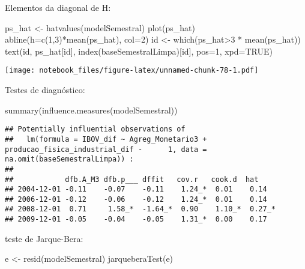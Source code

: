 \documentclass[
]{article}
\newenvironment{Shaded}{\begin{snugshade}}{\end{snugshade}}
\newcommand{\AttributeTok}[1]{\textcolor[rgb]{0.77,0.63,0.00}{#1}}
\newcommand{\ConstantTok}[1]{\textcolor[rgb]{0.00,0.00,0.00}{#1}}
\newcommand{\DecValTok}[1]{\textcolor[rgb]{0.00,0.00,0.81}{#1}}
\newcommand{\FunctionTok}[1]{\textcolor[rgb]{0.00,0.00,0.00}{#1}}
\newcommand{\NormalTok}[1]{#1}
\newcommand{\OtherTok}[1]{\textcolor[rgb]{0.56,0.35,0.01}{#1}}
\newcommand{\SpecialCharTok}[1]{\textcolor[rgb]{0.00,0.00,0.00}{#1}}
\begin{document}
Elementos da diagonal de H:

\begin{Shaded}
\begin{Highlighting}[]
\NormalTok{ps\_hat }\OtherTok{\textless{}{-}} \FunctionTok{hatvalues}\NormalTok{(modelSemestral)}
\FunctionTok{plot}\NormalTok{(ps\_hat)}
\FunctionTok{abline}\NormalTok{(}\AttributeTok{h=}\FunctionTok{c}\NormalTok{(}\DecValTok{1}\NormalTok{,}\DecValTok{3}\NormalTok{)}\SpecialCharTok{*}\FunctionTok{mean}\NormalTok{(ps\_hat), }\AttributeTok{col=}\DecValTok{2}\NormalTok{)}
\NormalTok{id }\OtherTok{\textless{}{-}} \FunctionTok{which}\NormalTok{(ps\_hat}\SpecialCharTok{\textgreater{}}\DecValTok{3} \SpecialCharTok{*} \FunctionTok{mean}\NormalTok{(ps\_hat))}
\FunctionTok{text}\NormalTok{(id, ps\_hat[id], }\FunctionTok{index}\NormalTok{(baseSemestralLimpa)[id], }\AttributeTok{pos=}\DecValTok{1}\NormalTok{, }\AttributeTok{xpd=}\ConstantTok{TRUE}\NormalTok{)}
\end{Highlighting}
\end{Shaded}

\texttt{[image: notebook\_files/figure-latex/unnamed-chunk-78-1.pdf]}

Testes de diagnóstico:

\begin{Shaded}
\begin{Highlighting}[]
\FunctionTok{summary}\NormalTok{(}\FunctionTok{influence.measures}\NormalTok{(modelSemestral))}
\end{Highlighting}
\end{Shaded}

\begin{verbatim}
## Potentially influential observations of
##   lm(formula = IBOV_dif ~ Agreg_Monetario3 + producao_fisica_industrial_dif -      1, data = na.omit(baseSemestralLimpa)) :
## 
##            dfb.A_M3 dfb.p___ dffit   cov.r   cook.d  hat    
## 2004-12-01 -0.11    -0.07    -0.11    1.24_*  0.01    0.14  
## 2006-12-01 -0.12    -0.06    -0.12    1.24_*  0.01    0.14  
## 2008-12-01  0.71     1.58_*  -1.64_*  0.90    1.10_*  0.27_*
## 2009-12-01 -0.05    -0.04    -0.05    1.31_*  0.00    0.17
\end{verbatim}

teste de Jarque-Bera:

\begin{Shaded}
\begin{Highlighting}[]
\NormalTok{e }\OtherTok{\textless{}{-}} \FunctionTok{resid}\NormalTok{(modelSemestral)}
\FunctionTok{jarqueberaTest}\NormalTok{(e)}
\end{Highlighting}
\end{Shaded}
\end{document}
